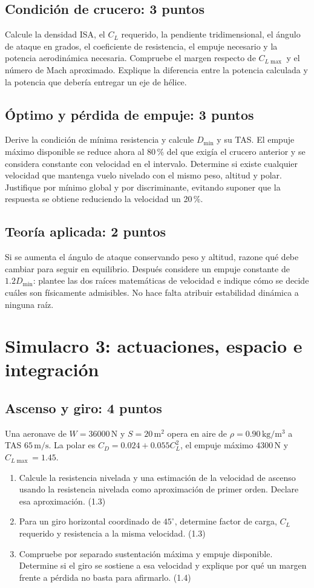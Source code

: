 \section{Condición de crucero: 3 puntos}
Calcule la densidad ISA, el $C_L$ requerido, la pendiente tridimensional, el ángulo de ataque en grados, el coeficiente de resistencia, el empuje necesario y la potencia aerodinámica necesaria. Compruebe el margen respecto de $C_{L\max}$ y el número de Mach aproximado. Explique la diferencia entre la potencia calculada y la potencia que debería entregar un eje de hélice.
\section{Óptimo y pérdida de empuje: 3 puntos}
Derive la condición de mínima resistencia y calcule $D_{\min}$ y su TAS. El empuje máximo disponible se reduce ahora al 80\,\% del que exigía el crucero anterior y se considera constante con velocidad en el intervalo. Determine si existe cualquier velocidad que mantenga vuelo nivelado con el mismo peso, altitud y polar. Justifique por mínimo global y por discriminante, evitando suponer que la respuesta se obtiene reduciendo la velocidad un 20\,\%.
\section{Teoría aplicada: 2 puntos}
Si se aumenta el ángulo de ataque conservando peso y altitud, razone qué debe cambiar para seguir en equilibrio. Después considere un empuje constante de $1.2D_{\min}$: plantee las dos raíces matemáticas de velocidad e indique cómo se decide cuáles son físicamente admisibles. No hace falta atribuir estabilidad dinámica a ninguna raíz.
\chapter{Simulacro 3: actuaciones, espacio e integración}
\section{Ascenso y giro: 4 puntos}
Una aeronave de $W=36000\,\mathrm N$ y $S=20\,\mathrm{m^2}$ opera en aire de $\rho=0.90\,\mathrm{kg/m^3}$ a TAS $65\,\mathrm{m/s}$. La polar es $C_D=0.024+0.055C_L^2$, el empuje máximo $4300\,\mathrm N$ y $C_{L\max}=1.45$.
\begin{enumerate}[label=\alph*)]
\item Calcule la resistencia nivelada y una estimación de la velocidad de ascenso usando la resistencia nivelada como aproximación de primer orden. Declare esa aproximación. (1.3)
\item Para un giro horizontal coordinado de $45^\circ$, determine factor de carga, $C_L$ requerido y resistencia a la misma velocidad. (1.3)
\item Compruebe por separado sustentación máxima y empuje disponible. Determine si el giro se sostiene a esa velocidad y explique por qué un margen frente a pérdida no basta para afirmarlo. (1.4)
\end{enumerate}
